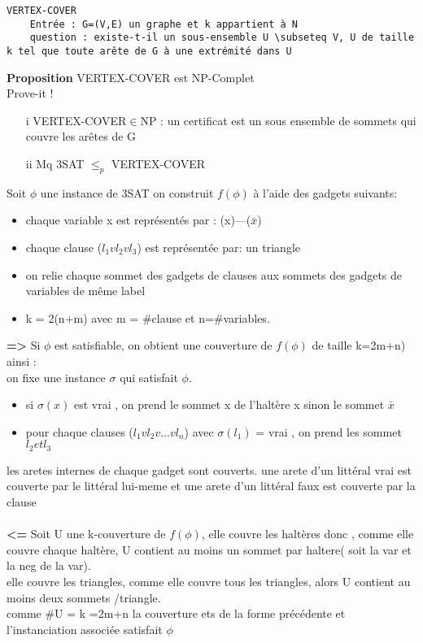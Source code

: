\documentclass{article}
\begin{document}
\begin{verbatim}
VERTEX-COVER
	Entrée : G=(V,E) un graphe et k appartient à N
	question : existe-t-il un sous-ensemble U \subseteq V, U de taille k tel que toute arête de G à une extrémité dans U
\end{verbatim}
\textbf{Proposition} VERTEX-COVER est NP-Complet \\Prove-it !
\begin{itemize}
\item[i] VERTEX-COVER$\in$NP : un certificat est un sous ensemble de sommets qui couvre les arêtes de G
\item[ii] Mq 3SAT $\leq_p$ VERTEX-COVER
\end{itemize}
Soit  $\phi$ une instance de 3SAT on construit $f(\phi)$ à l'aide des gadgets suivants:
\begin{itemize}
\item chaque variable x est représentés par : (x)---($\bar{x}$)
\item chaque clause ($l_1 v l_2 v l_3$) est représentée par: un triangle
\item on relie chaque sommet des gadgets de clauses aux sommets des gadgets de variables de même label
\item k = 2(n+m) avec m = \#clause et n=\#variables.
\end{itemize}
\textbf{=>} Si $\phi$ est satisfiable, on obtient une couverture de $f(\phi)$ de taille k=2m+n) ainsi : \\ on fixe une instance $\sigma$ qui satisfait $\phi$.
\begin{itemize}
\item si $\sigma(x) $ est vrai , on prend le sommet x de l'haltère x sinon le sommet $\bar{x}$
\item pour chaque clauses ($l_1 v l_2 v ... v l_n$) avec $\sigma(l_1)$ = vrai , on prend les sommet$ l_2 et l_3$
\end{itemize}
les aretes internes de chaque gadget sont couverts. une arete d'un littéral vrai est couverte par le littéral lui-meme et une arete d'un littéral faux est couverte par la clause\\\\\textbf{<= } Soit U une k-couverture de $f(\phi)$, elle couvre les haltères donc , comme elle couvre chaque haltère, U contient au moins un sommet par haltere( soit la var et la neg de la var).\\elle couvre les triangles, comme elle couvre tous les triangles, alors U contient au moins deux sommets /triangle.\\comme \#U = k =2m+n la couverture ets de la forme précédente et l'instanciation associée satisfait $\phi$
\end{document}
